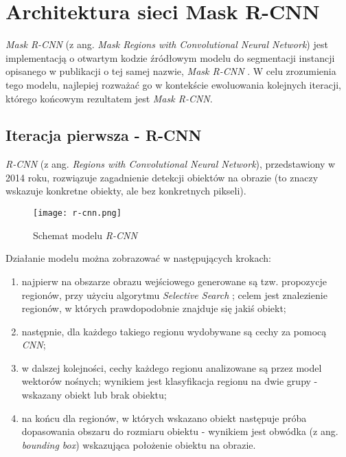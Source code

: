 \section{Architektura sieci Mask R-CNN}
\label{sec:architekrura_mask_rcnn}

\textit{Mask R-CNN} \cite{matterport-mask-rcnn} (z ang. \textit{Mask Regions with Convolutional Neural Network}) jest implementacją o otwartym kodzie źródłowym modelu do segmentacji instancji opisanego w publikacji o tej samej nazwie, \textit{Mask R-CNN} \cite{general-mask-rcnn}.
W celu zrozumienia tego modelu, najlepiej rozważać go w kontekście ewoluowania kolejnych iteracji, którego końcowym rezultatem jest \textit{Mask R-CNN}.

\subsection{Iteracja pierwsza - R-CNN}

\textit{R-CNN} \cite{rcnn} (z ang. \textit{Regions with Convolutional Neural Network}), przedstawiony w 2014 roku, rozwiązuje zagadnienie detekcji obiektów na obrazie (to znaczy wskazuje konkretne obiekty, ale bez konkretnych pikseli).

\begin{figure}[h]
  \centering
  \caption{Schemat modelu \textit{R-CNN}}
  \texttt{[image: r-cnn.png]}
  \label{fig:r_cnn}
\end{figure}

Działanie modelu można zobrazować w następujących krokach:
\label{sec:regiony}
\begin{enumerate}
  \item najpierw na obszarze obrazu wejściowego generowane są tzw. propozycje regionów, przy użyciu algorytmu \textit{Selective Search} \cite{selective-search}; celem jest znalezienie regionów, w których prawdopodobnie znajduje się jakiś obiekt;
	\item następnie, dla każdego takiego regionu wydobywane są cechy za pomocą \textit{CNN};
  \item w dalszej kolejności, cechy każdego regionu analizowane są przez model wektorów nośnych; wynikiem jest klasyfikacja regionu na dwie grupy - wskazany obiekt lub brak obiektu;
	\item na końcu dla regionów, w których wskazano obiekt następuje próba dopasowania obszaru do rozmiaru obiektu - wynikiem jest obwódka (z ang. \textit{bounding box}) wskazująca położenie obiektu na obrazie.
\end{enumerate}

